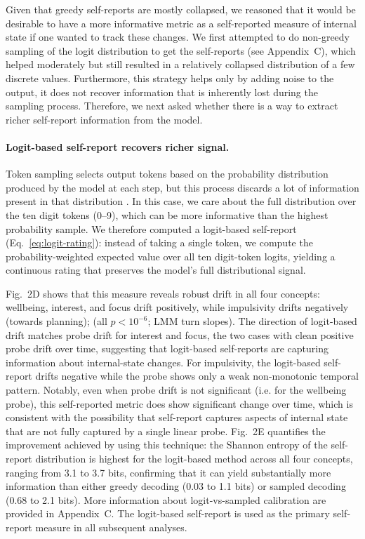 \documentclass[10pt]{article}
\begin{document}
Given that greedy self-reports are mostly collapsed, we reasoned that it would be desirable to have a more informative metric as a self-reported measure of internal state if one wanted to track these changes. We first attempted to do non-greedy sampling of the logit distribution to get the self-reports (see Appendix~C), which helped moderately but still resulted in a relatively collapsed distribution of a few discrete values. Furthermore, this strategy helps only by adding noise to the output, it does not recover information that is inherently lost during the sampling process. Therefore, we next asked whether there is a way to extract richer self-report information from the model.

\paragraph{Logit-based self-report recovers richer signal.}
Token sampling selects output tokens based on the probability distribution produced by the model at each step, but this process discards a lot of information present in that distribution \citep{Kumar2024,Geng2024,Yona2024}.
In this case, we care about the full distribution over the ten digit tokens (0--9), which can be more informative than the highest probability sample.
We therefore computed a logit-based self-report (Eq.~\ref{eq:logit-rating}): instead of taking a single token, we compute the probability-weighted expected value over all ten digit-token logits, yielding a continuous rating that preserves the model's full distributional signal.

Fig.~2D shows that this measure reveals robust drift in all four concepts: wellbeing, interest, and focus drift positively, while impulsivity drifts negatively (towards planning); (all $p < 10^{-6}$; LMM turn slopes).
The direction of logit-based drift matches probe drift for interest and focus, the two cases with clean positive probe drift over time, suggesting that logit-based self-reports are capturing information about internal-state changes. For impulsivity, the logit-based self-report drifts negative while the probe shows only a weak non-monotonic temporal pattern. Notably, even when probe drift is not significant (i.e. for the wellbeing probe), this self-reported metric does show significant change over time, which is consistent with the possibility that self-report captures aspects of internal state that are not fully captured by a single linear probe.
Fig.~2E quantifies the improvement achieved by using this technique: the Shannon entropy of the self-report distribution is highest for the logit-based method across all four concepts, ranging from 3.1 to 3.7 bits, confirming that it can yield substantially more information than either greedy decoding (0.03 to 1.1 bits) or sampled decoding (0.68 to 2.1 bits). More information about logit-vs-sampled calibration are provided in Appendix~C.
The logit-based self-report is used as the primary self-report measure in all subsequent analyses.
\end{document}
